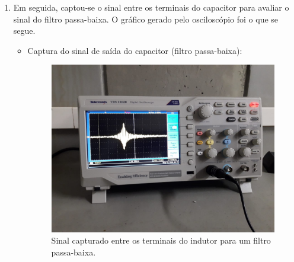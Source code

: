 \documentclass[letterpaper, 12pt]{article}
\begin{document}
\begin{enumerate}
    \item Em seguida, captou-se o sinal entre os terminais do capacitor para avaliar o sinal do filtro passa-baixa. O gráfico gerado pelo osciloscópio foi o que se segue.
    \begin{itemize}
        \item Captura do sinal de saída do capacitor (filtro passa-baixa):
        \begin{figure}[h]
            \centering
            \includegraphics[width=0.5\linewidth]{figures/Band-pass_filter.jpeg}
            \caption{Sinal capturado entre os terminais do indutor para um filtro passa-baixa.}
            \label{fig:Band-pass Filter}
        \end{figure}
    \end{itemize}
\end{enumerate}
\end{document}
